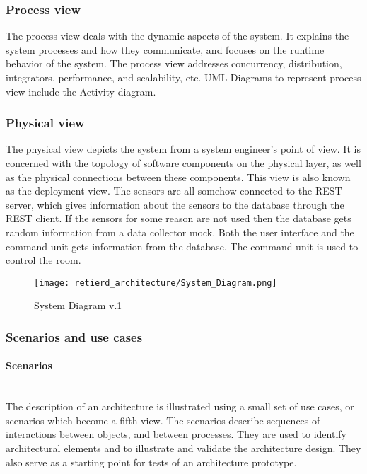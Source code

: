\documentclass[../document]{subfiles}
\begin{document}
\subsubsection{Process view}
The process view deals with the dynamic aspects of the system. It explains the system processes and how they communicate, and focuses on the runtime behavior of the system. The process view addresses concurrency, distribution, integrators, performance, and scalability, etc. UML Diagrams to represent process view include the Activity diagram.


\subsubsection{Physical view}
The physical view depicts the system from a system engineer's point of view. It is concerned with the topology of software components on the physical layer, as well as the physical connections between these components. This view is also known as the deployment view. The sensors are all somehow connected to the REST server, which gives information about the sensors to the database through the REST client. If the sensors for some reason are not used then the database gets random information from a data collector mock. Both the user interface and the command unit gets information from the database. The command unit is used to control the room. 

\begin{figure}[H]
	\centering
	\texttt{[image: retierd\_architecture/System\_Diagram.png]}
	\caption{System Diagram v.1}
\end{figure}

\subsubsection{Scenarios and use cases}
\paragraph{Scenarios} \ \\
The description of an architecture is illustrated using a small set of use cases, or scenarios which become a fifth view. The scenarios describe sequences of interactions between objects, and between processes. They are used to identify architectural elements and to illustrate and validate the architecture design. They also serve as a starting point for tests of an architecture prototype.
\end{document}
